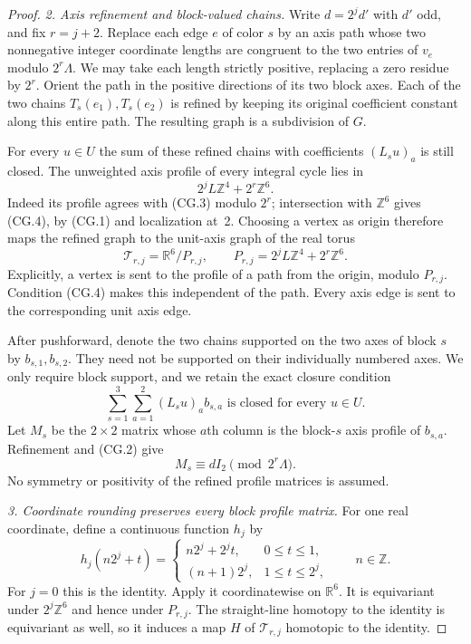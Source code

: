 \begin{proof}
\emph{2. Axis refinement and block-valued chains.}
Write $d=2^jd'$ with $d'$ odd, and fix $r=j+2$.
Replace each edge $e$ of color $s$ by an axis path whose two
nonnegative integer coordinate lengths are congruent to the two
entries of $v_e$ modulo $2^r\Lambda$. We may take each length
strictly positive, replacing a zero residue by $2^r$.
Orient the path in the positive directions of its two block axes.
Each of the two chains $T_s(e_1),T_s(e_2)$ is refined by keeping
its original coefficient constant along this entire path.
The resulting graph is a subdivision of $G$.

For every $u\in U$ the sum of these refined chains with coefficients
$(L_su)_a$ is still closed. The unweighted axis profile of every
integral cycle lies in
\[
              2^jL\mathbb Z^4+2^r\mathbb Z^6.
 \tag{CG.4}
\]
Indeed its profile agrees with (CG.3) modulo $2^r$; intersection
with $\mathbb Z^6$ gives (CG.4), by (CG.1) and localization at~2.
Choosing a vertex as origin therefore maps the refined graph to
the unit-axis graph of the real torus
\[
 \mathcal T_{r,j}=\mathbb R^6/P_{r,j},\qquad
 P_{r,j}=2^jL\mathbb Z^4+2^r\mathbb Z^6.
 \tag{CG.5}
\]
Explicitly, a vertex is sent to the profile of a path from the
origin, modulo $P_{r,j}$. Condition (CG.4) makes this independent
of the path. Every axis edge is sent to the corresponding unit
axis edge.

After pushforward, denote the two chains supported on the two
axes of block $s$ by $b_{s,1},b_{s,2}$. They need not be supported
on their individually numbered axes. We only require block
support, and we retain the exact closure condition
\[
       \sum_{s=1}^3\sum_{a=1}^2(L_su)_a b_{s,a}
                         \text{ is closed for every }u\in U.
 \tag{CG.6}
\]
Let $M_s$ be the $2\times2$ matrix whose $a$th column is the
block-$s$ axis profile of $b_{s,a}$. Refinement and (CG.2) give
\[
                           M_s\equiv dI_2\pmod{2^r\Lambda}.
 \tag{CG.7}
\]
No symmetry or positivity of the refined profile matrices is
assumed.

\emph{3. Coordinate rounding preserves every block profile matrix.}
For one real coordinate, define a continuous function $h_j$ by
\[
 h_j(n2^j+t)=
 \begin{cases}
 n2^j+2^jt,&0\le t\le1,\\
 (n+1)2^j,&1\le t\le2^j,
 \end{cases}
 \qquad n\in\mathbb Z.
 \tag{CG.8}
\]
For $j=0$ this is the identity. Apply it coordinatewise on
$\mathbb R^6$. It is equivariant under $2^j\mathbb Z^6$ and
hence under $P_{r,j}$. The straight-line homotopy to the identity
is equivariant as well, so it induces a map $H$ of
$\mathcal T_{r,j}$ homotopic to the identity.


\end{proof}

